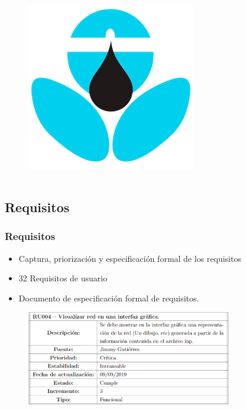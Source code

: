 \documentclass[9pt]{beamer}
\begin{document}
\begin{frame}
\begin{columns}
            \begin{figure}[H]
                \centering
                \includegraphics[width=\textwidth]{assets/Tecnologia/EpanetToolkit.png}
            \end{figure}
        \end{columns}
    \end{frame}

    \subsection{Requisitos}
    \begin{frame}
        \frametitle{Requisitos}                 
        
        \begin{itemize}
            \item Captura, priorización y especificación formal de los requisitos
            \item 32 Requisitos de usuario
            \item Documento de especificación formal de requisitos.
        \end{itemize}

        \begin{figure}
            \includegraphics[width=0.8\textwidth]{assets/Requisito.png}
        \end{figure}

    \end{frame}
\end{document}
